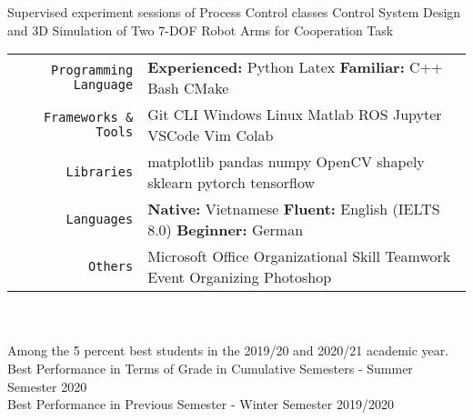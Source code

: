 \documentclass[
10pt, A4, english,
draft = false,
twoside = false,
]{article}
\begin{document}
	{Supervised experiment sessions of Process Control classes}
	{Control System Design and 3D Simulation of Two 7-DOF Robot Arms for Cooperation Task}
	\tab \begin{tabular}{r p{}}
		\texttt{\large Programming Language} & \textbf{Experienced:} Python \cvContactSep Latex \tab \textbf{Familiar:} C++ \cvContactSep Bash \cvContactSep CMake\\
		\texttt{\large Frameworks \& Tools} & Git \cvContactSep CLI \cvContactSep Windows \cvContactSep Linux \cvContactSep Matlab \cvContactSep ROS \cvContactSep Jupyter \cvContactSep VSCode \cvContactSep Vim \cvContactSep Colab\\
		\texttt{\large Libraries} & matplotlib \cvContactSep pandas \cvContactSep numpy \cvContactSep OpenCV \cvContactSep shapely \cvContactSep sklearn \cvContactSep pytorch \cvContactSep tensorflow\\
		\texttt{\large Languages} & \textbf{Native:} Vietnamese \cvContactSep \textbf{Fluent:} English (IELTS 8.0) \cvContactSep \textbf{Beginner:} German \\
		\texttt{\large Others} & Microsoft Office \cvContactSep Organizational Skill \cvContactSep Teamwork \cvContactSep Event Organizing \cvContactSep Photoshop
	\end{tabular}\\~\\
	{Among the 5 percent best students in the 2019/20 and 2020/21 academic year.}
	{Best Performance in Terms of Grade in Cumulative Semesters - Summer Semester 2020\\
		Best Performance in Previous Semester - Winter Semester 2019/2020}
\end{document}
